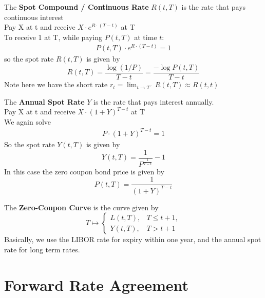 \begin{definition}
    The \textbf{Spot Compound / Continuous Rate} $R(t, T)$ is the rate that pays continuous interest\\
    Pay X at t and receive $X \cdot e^{R \cdot (T - t)}$ at T \\
    To receive 1 at T, while paying $P(t, T)$ at time $t$: 
    \begin{align*}
        P(t, T) \cdot e^{R \cdot (T - t)} = 1 
    \end{align*}
    so the spot rate $R(t, T)$ is given by
    $$
        R(t, T) = \frac{\log(1/P)}{T - t} = 
        \frac{-\log P(t, T)}{T - t}
    $$
    Note here we have the short rate $r_t = \lim_{t \to T^-}R(t, T) \approx R(t, t)$
\end{definition}

\begin{definition}
    The \textbf{Annual Spot Rate} $Y$ is the rate that pays interest annually. \\
    Pay X at t and receive $X \cdot (1 + Y)^{T - t}$ at T \\
    We again solve
    \begin{align*}
        P \cdot (1 + Y)^{T - t} = 1
    \end{align*}
    So the spot rate $Y(t, T)$ is given by
    $$
        Y(t, T) = \frac{1}{P^\frac{1}{T - t}} - 1
    $$
    In this case the zero coupon bond price is given by
    $$
        P(t, T) = \frac{1}{(1 + Y)^{T - t}}
    $$
\end{definition}

\begin{definition}
    The \textbf{Zero-Coupon Curve} is the curve given by
$$
    T \mapsto 
\begin{cases} 
    L(t, T), &  T \leq t+1, \\
    Y(t, T), & T > t + 1
\end{cases}
$$
Basically, we use the LIBOR rate for expiry within one year, and the annual spot rate for long term rates.
\end{definition}

\section{Forward Rate Agreement}

